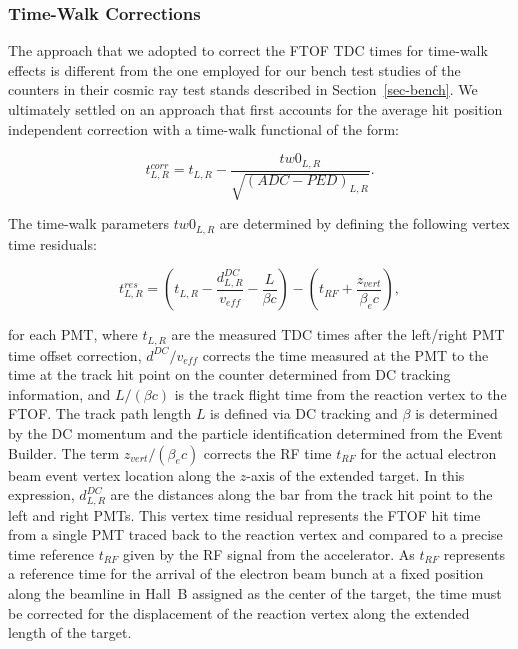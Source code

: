 \documentclass{elsart}
\begin{document}
\subsubsection{Time-Walk Corrections}
\label{sec-tw}

The approach that we adopted to correct the FTOF TDC times for time-walk effects is different from
the one employed for our bench test studies of the counters in their cosmic ray test stands described in
Section~\ref{sec-bench}. We ultimately settled on an approach that first accounts for the average hit
position independent correction with a time-walk functional of the form:

\begin{equation}
\label{tw-func}
t^{corr}_{L,R} = t_{L,R} - \frac{tw0_{L,R}}{\sqrt{(ADC - PED)_{L,R}}}.
\end{equation}

The time-walk parameters $tw0_{L,R}$ are determined by defining the following vertex time residuals:

\begin{equation}
\label{tres}
t_{L,R}^{res} = \left(t_{L,R} - \frac{d_{L,R}^{DC}}{v_{eff}} - \frac{L}{\beta c} \right) 
- \left( t_{RF} + \frac{z_{vert}}{\beta_e c} \right),
\end{equation}

\noindent
for each PMT, where $t_{L,R}$ are the measured TDC times after the left/right PMT time offset
correction, $d^{DC}/v_{eff}$ corrects the time measured at the PMT to the time at the track hit
point on the counter determined from DC tracking information, and $L/(\beta c)$ is the track
flight time from the reaction vertex to the FTOF. The track path length $L$ is defined via DC
tracking and $\beta$ is determined by the DC momentum and the particle identification determined
from the Event Builder. The term $z_{vert}/(\beta_e c)$ corrects the RF time $t_{RF}$ for the actual
electron beam event vertex location along the $z$-axis of the extended target. In this expression,
$d_{L,R}^{DC}$ are the distances along the bar from the track hit point to the left and right PMTs.
This vertex time residual represents the FTOF hit time from a single PMT traced back to the reaction
vertex and compared to a precise time reference $t_{RF}$ given by the RF signal from the accelerator.
As $t_{RF}$ represents a reference time for the arrival of the electron beam bunch at a fixed
position along the beamline in Hall~B assigned as the center of the target, the time must be corrected
for the displacement of the reaction vertex along the extended length of the target.
\end{document}
